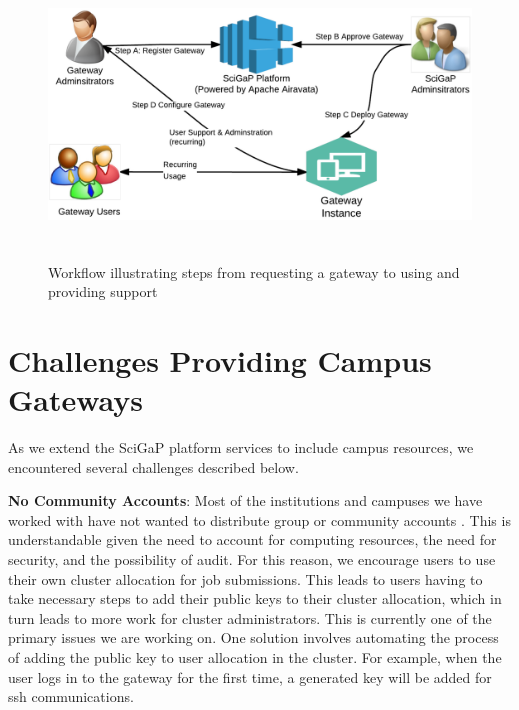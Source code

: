 \documentclass[sigconf]{acmart}
\begin{document}
\begin{figure}
\includegraphics[height=3in, width=6in]{figures/gateway-approvals.pdf}
\caption{Workflow illustrating steps from requesting a gateway to using and providing support}
\end{figure}

\section{Challenges Providing Campus Gateways}
As we extend the SciGaP platform services to include campus resources, we encountered several challenges described below.

\noindent\textbf{No Community Accounts}: Most of the institutions and campuses we have worked with have not wanted to distribute group or community accounts \cite{welch2007aaaa}. This is understandable given the need to account for computing resources, the need for security, and the possibility of audit. For this reason, we encourage users to use their own cluster allocation for job submissions. This leads to users having to take necessary steps to add their public keys to their cluster allocation, which in turn leads to more work for cluster administrators.  This is currently one of the primary issues we are working on. One solution involves automating the process of adding the public key to user allocation in the cluster.  For example,  when the user logs in to the gateway for the first time, a generated key will be added for ssh communications.
\end{document}
